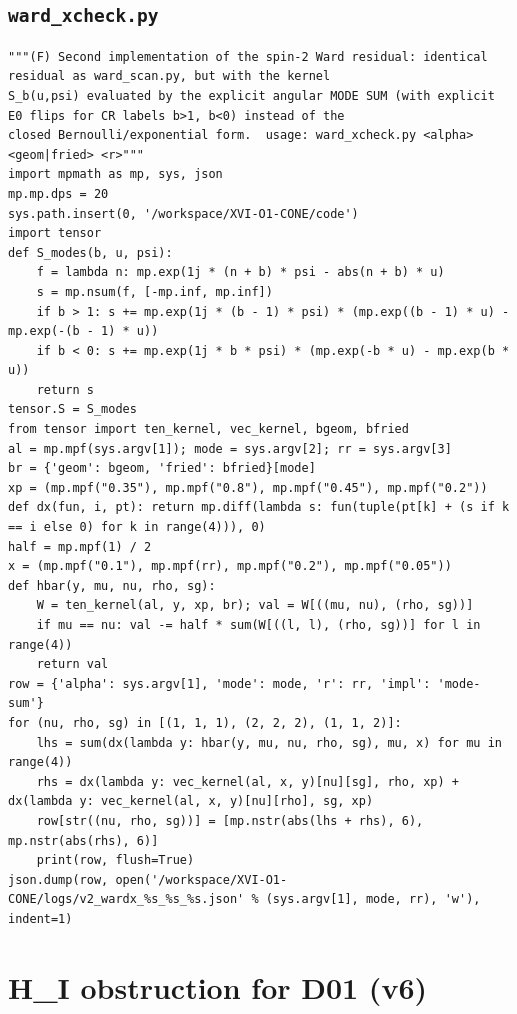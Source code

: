 \documentclass[10pt]{article}
\begin{document}
\subsection{\texttt{ward\_xcheck.py}}
\begin{lstlisting}
"""(F) Second implementation of the spin-2 Ward residual: identical residual as ward_scan.py, but with the kernel
S_b(u,psi) evaluated by the explicit angular MODE SUM (with explicit E0 flips for CR labels b>1, b<0) instead of the
closed Bernoulli/exponential form.  usage: ward_xcheck.py <alpha> <geom|fried> <r>"""
import mpmath as mp, sys, json
mp.mp.dps = 20
sys.path.insert(0, '/workspace/XVI-O1-CONE/code')
import tensor
def S_modes(b, u, psi):
    f = lambda n: mp.exp(1j * (n + b) * psi - abs(n + b) * u)
    s = mp.nsum(f, [-mp.inf, mp.inf])
    if b > 1: s += mp.exp(1j * (b - 1) * psi) * (mp.exp((b - 1) * u) - mp.exp(-(b - 1) * u))
    if b < 0: s += mp.exp(1j * b * psi) * (mp.exp(-b * u) - mp.exp(b * u))
    return s
tensor.S = S_modes
from tensor import ten_kernel, vec_kernel, bgeom, bfried
al = mp.mpf(sys.argv[1]); mode = sys.argv[2]; rr = sys.argv[3]
br = {'geom': bgeom, 'fried': bfried}[mode]
xp = (mp.mpf("0.35"), mp.mpf("0.8"), mp.mpf("0.45"), mp.mpf("0.2"))
def dx(fun, i, pt): return mp.diff(lambda s: fun(tuple(pt[k] + (s if k == i else 0) for k in range(4))), 0)
half = mp.mpf(1) / 2
x = (mp.mpf("0.1"), mp.mpf(rr), mp.mpf("0.2"), mp.mpf("0.05"))
def hbar(y, mu, nu, rho, sg):
    W = ten_kernel(al, y, xp, br); val = W[((mu, nu), (rho, sg))]
    if mu == nu: val -= half * sum(W[((l, l), (rho, sg))] for l in range(4))
    return val
row = {'alpha': sys.argv[1], 'mode': mode, 'r': rr, 'impl': 'mode-sum'}
for (nu, rho, sg) in [(1, 1, 1), (2, 2, 2), (1, 1, 2)]:
    lhs = sum(dx(lambda y: hbar(y, mu, nu, rho, sg), mu, x) for mu in range(4))
    rhs = dx(lambda y: vec_kernel(al, x, y)[nu][sg], rho, xp) + dx(lambda y: vec_kernel(al, x, y)[nu][rho], sg, xp)
    row[str((nu, rho, sg))] = [mp.nstr(abs(lhs + rhs), 6), mp.nstr(abs(rhs), 6)]
    print(row, flush=True)
json.dump(row, open('/workspace/XVI-O1-CONE/logs/v2_wardx_%s_%s_%s.json' % (sys.argv[1], mode, rr), 'w'), indent=1)
\end{lstlisting}
\section{H_I obstruction for D01 (v6)}
\end{document}
